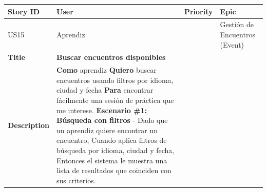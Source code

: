 {\def\LTcaptype{none} %
\begin{longtable}[]{@{}
  >{\raggedright\arraybackslash}p{}
  >{\raggedright\arraybackslash}p{}
  >{\raggedright\arraybackslash}p{}
  >{\raggedright\arraybackslash}p{}@{}}
\toprule\noalign{}
\begin{minipage}[b]{\linewidth}\raggedright
Story ID
\end{minipage} & \begin{minipage}[b]{\linewidth}\raggedright
User
\end{minipage} & \begin{minipage}[b]{\linewidth}\raggedright
Priority
\end{minipage} & \begin{minipage}[b]{\linewidth}\raggedright
Epic
\end{minipage} \\
\midrule\noalign{}
\endhead
\bottomrule\noalign{}
\endlastfoot
US15 & Aprendiz & 3 & Gestión de Encuentros (Event) \\
\textbf{Title} & \textbf{Buscar encuentros disponibles} & & \\
\textbf{Description} & \textbf{Como} aprendiz \textbf{Quiero} buscar
encuentros usando filtros por idioma, ciudad y fecha \textbf{Para}
encontrar fácilmente una sesión de práctica que me interese.
\textbf{Escenario \#1: Búsqueda con filtros} - Dado que un aprendiz
quiere encontrar un encuentro, Cuando aplica filtros de búsqueda por
idioma, ciudad y fecha, Entonces el sistema le muestra una lista de
resultados que coinciden con sus criterios. & & \\
\end{longtable}
}

